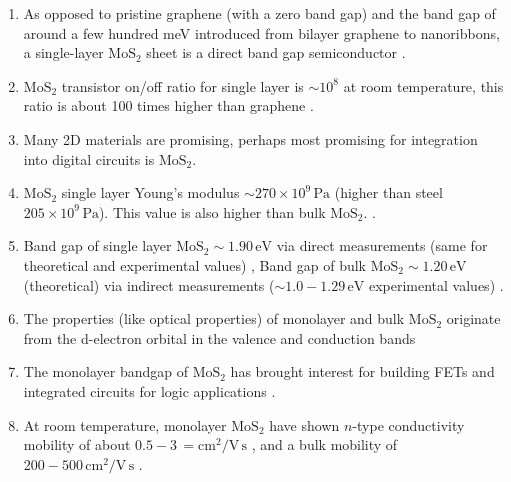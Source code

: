 \documentclass{article}
\begin{document}
\begin{enumerate}
\begin{enumerate}
			\item{As opposed to pristine graphene (with a zero band gap) and the band gap of around a few hundred meV introduced from bilayer graphene to nanoribbons, a single-layer $\mathrm{MoS}_2$ sheet is a direct band gap semiconductor \cite{grapheneLike2Dreview2013}. }
			\item{$\mathrm{MoS}_2$ transistor on/off ratio for single layer is $\sim 10^8$ at room temperature, this ratio is about 100 times higher than graphene \cite{grapheneLike2Dreview2013, novoselovEtAl2004}.}
			\item{Many 2D materials are promising, perhaps most promising for integration into digital circuits is $\mathrm{MoS}_2$.}
			\item{$\mathrm{MoS}_2$ single layer Young's modulus $\sim 270 \times 10^9 \mathrm{\, Pa}$ (higher than steel $205 \times 10^9 \mathrm{\, Pa}$). This value is also higher than bulk $\mathrm{MoS}_2$. \cite{singleLayerMoS2electronics2015}.}
			\item{Band gap of single layer $\mathrm{MoS}_2 \sim 1.90 \mathrm{\, eV}$ via direct measurements (same for theoretical and experimental values) \cite{Fortin1982}, Band gap of bulk $\mathrm{MoS}_2\sim 1.20 \mathrm{\, eV}$ (theoretical) via indirect measurements ($\sim 1.0-1.29 \mathrm{\, eV}$ experimental values) \cite{grapheneLike2Dreview2013, Mak2010, Gourmelon1997}.}
			\item{The properties (like optical properties) of monolayer and bulk $\mathrm{MoS}_2$ originate from the d-electron orbital in the valence and conduction bands \cite{Mak2010, Splendiani2010}}
			\item{The monolayer bandgap of $\mathrm{MoS}_2$ has brought interest for building FETs and integrated circuits for logic applications \cite{Radisavljevic2011, Wang2012}.}
			\item{At room temperature, monolayer $\mathrm{MoS}_2$ have shown $n$-type conductivity mobility of about $0.5-3 \mathrm{\,=cm}^2/\mathrm{V\, s}$ \cite{Ghatak2011, novoselovEtAl2005}, and a bulk mobility of $200-500\mathrm{\, cm}^2/\mathrm{V\, s}$ \cite{Fivaz1967}.}

		\end{enumerate} %


\end{enumerate}
\end{document}
